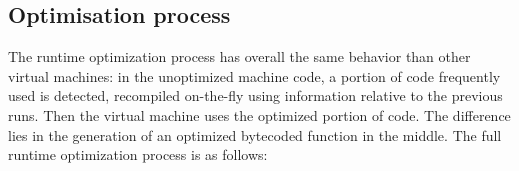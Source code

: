 \documentclass[a4paper,12pt,twoside]{../includes/ThesisStyle}
\begin{document}



\subsection {Optimisation process}

The runtime optimization process has overall the same behavior than other virtual machines: in the unoptimized machine code, a portion of code frequently used is detected, recompiled on-the-fly using information relative to the previous runs. Then the virtual machine uses the optimized portion of code. The difference lies in the generation of an optimized bytecoded function in the middle. The full runtime optimization process is as follows:
\end{document}
